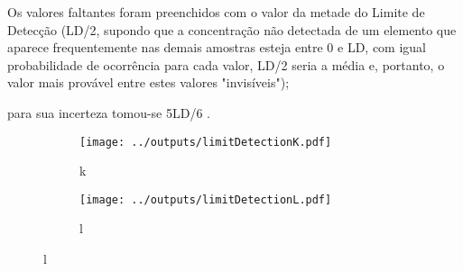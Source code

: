 Os valores faltantes foram preenchidos com o valor da metade do Limite de Detecção 
(LD/2, supondo que a concentração não detectada de um elemento que aparece 
frequentemente nas demais amostras esteja entre 0 e LD, com igual 
probabilidade de ocorrência para cada valor, LD/2 seria a média e, portanto, 
o valor mais provável entre estes valores "invisíveis"); 

para sua incerteza tomou-se 5LD/6 \citep{polissar1998}.

\begin{figure}[H]
  \caption{}
  \begin{subfigure}[b]{0.5\textwidth}
    \texttt{[image: ../outputs/limitDetectionK.pdf]}
    \caption{k}
  \end{subfigure}%
  \begin{subfigure}[b]{0.5\textwidth}
    \texttt{[image: ../outputs/limitDetectionL.pdf]}
    \caption{l}
  \end{subfigure}
\end{figure}

